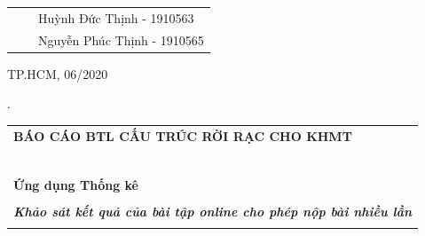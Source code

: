 \documentclass[a4paper]{article}
\theoremstyle{definition}
\begin{document}
\begin{titlepage}
\begin{table}[h]
\begin{tabular}{rrl}
	& & Huỳnh Đức Thịnh - 1910563 \\
	& & Nguyễn Phúc Thịnh - 1910565 \\
	
	\end{tabular}
	\end{table}
	\vspace{3cm}
	\begin{center}
	{\footnotesize TP.HCM, 06/2020}
	\end{center}
	\end{titlepage}
	\newpage


	\noindent .
	\vspace{6cm}
	
	
\begin{center}
	\begin{tabular}{c}
	\multicolumn{1}{l}{\textbf{{\Large BÁO CÁO BTL CẤU TRÚC RỜI RẠC CHO KHMT}}}\\
	~~\\
	\hline
	\\
	\multicolumn{1}{l}{\textbf{{\Large Ứng dụng Thống kê}}}\\
	\\
	\textbf{\normalsize \textit{ Khảo sát kết quả của bài tập online cho phép nộp bài nhiều lần}}\\
	\\
	\hline
	\end{tabular}
	\end{center}

	\vspace{5cm}

	\newpage
 \tableofcontents
 \vspace{3cm}
\newpage
\end{document}

